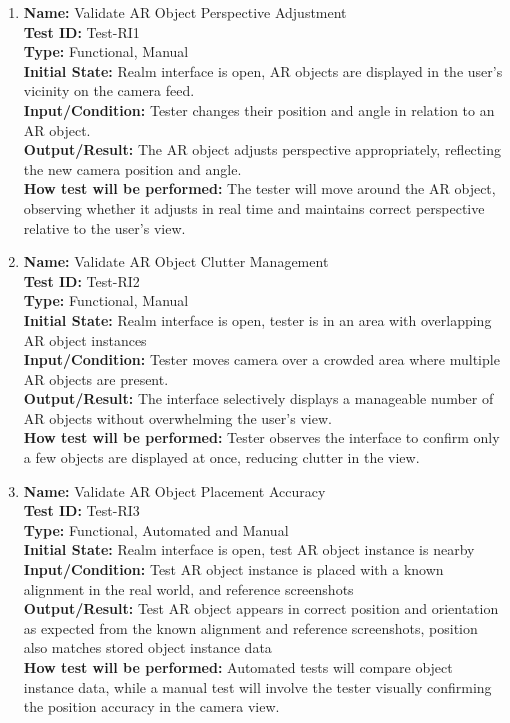 \documentclass[12pt, titlepage]{article}
\begin{document}
\begin{enumerate}


\item \textbf{Name:} Validate AR Object Perspective Adjustment \label{itm:Test-RI1} \\
\textbf{Test ID:} Test-RI1 \\
\textbf{Type:} Functional, Manual \\
\textbf{Initial State:} Realm interface is open, AR objects are displayed in the user’s vicinity on the camera feed. \\
\textbf{Input/Condition:} Tester changes their position and angle in relation to an AR object. \\
\textbf{Output/Result:} The AR object adjusts perspective appropriately, reflecting the new camera position and angle. \\ \textbf{How test will be performed:} The tester will move around the AR object, observing whether it adjusts in real time and maintains correct perspective relative to the user’s view.

\item \textbf{Name:} Validate AR Object Clutter Management \label{itm:Test-RI2} \\
\textbf{Test ID:} Test-RI2 \\
\textbf{Type:} Functional, Manual \\
\textbf{Initial State:} Realm interface is open, tester is in an area with overlapping AR object instances \\
\textbf{Input/Condition:} Tester moves camera over a crowded area where multiple AR objects are present. \\
\textbf{Output/Result:} The interface selectively displays a manageable number of AR objects without overwhelming the user’s view. \\ \textbf{How test will be performed:} Tester observes the interface to confirm only a few objects are displayed at once, reducing clutter in the view.

\item \textbf{Name:} Validate AR Object Placement Accuracy \label{itm:Test-RI3} \\
\textbf{Test ID:} Test-RI3 \\
\textbf{Type:} Functional, Automated and Manual \\
\textbf{Initial State:} Realm interface is open, test AR object instance is nearby \\
\textbf{Input/Condition:} Test AR object instance is placed with a known alignment in the real world, and reference screenshots \\ 
\textbf{Output/Result:} Test AR object appears in correct position and orientation as expected from the known alignment and reference screenshots, position also matches stored object instance data \\
\textbf{How test will be performed:} Automated tests will compare object instance data, while a manual test will involve the tester visually confirming the position accuracy in the camera view.



\end{enumerate}
\end{document}
